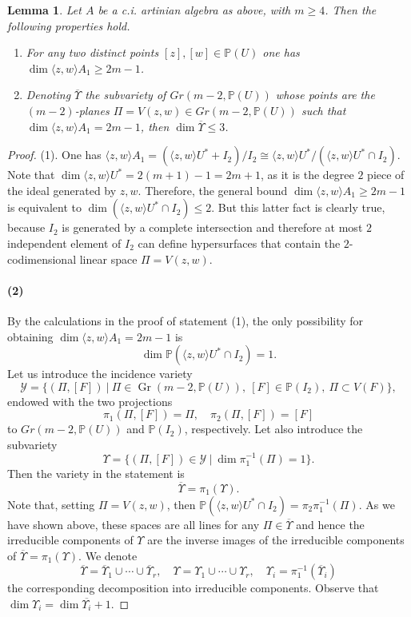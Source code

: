 \documentclass[10pt, a4paper]{amsart}
\theoremstyle{plain}
\newtheorem{lm}[prop]{Lemma}
\theoremstyle{definition}
\theoremstyle{remark}
\def\PP{\mathbb{P}}
\begin{document}
 \begin{lm}\label{lm:bdeltageq1} Let $A$ be a c.i. artinian algebra as above, with $m\geq 4$. Then the following properties hold.
\begin{enumerate}
\item For any two distinct points $[z],[w]\in \PP(U)$ one has $\dim \langle z,w\rangle A_1\geq 2m-1$.
\item Denoting $\overline{\varUpsilon}$ the subvariety of $Gr(m-2,\PP(U))$ whose points are the $(m-2)$-planes $\Pi=V(z,w)\in Gr(m-2,\PP(U))$ such that $\dim \langle z,w\rangle A_1= 2m-1$, then $\dim \overline{\varUpsilon}\leq 3$. 
\end{enumerate}
\end{lm}
\begin{proof} {(1).} One has 
$\langle z,w\rangle A_1=(\langle z,w\rangle U^\ast+I_2)/I_2\cong \langle z,w\rangle U^\ast/(\langle z,w\rangle U^\ast\cap I_2)$.
Note that $\dim\langle z,w\rangle U^\ast=2(m+1)-1=2m+1$, as it is the degree $2$ piece of the ideal generated by $z,w$. Therefore, the general bound  $\dim \langle z,w\rangle A_1\geq 2m-1$ is equivalent to $\dim(\langle z,w\rangle U^\ast\cap I_2)\leq 2$. But this latter fact is clearly true, because $I_2$ is generated by a complete intersection and therefore at most $2$  independent element of $I_2$ can define hypersurfaces that contain the $2$-codimensional linear space $\Pi=V(z,w)$. 
\paragraph{(2)}
By the calculations in the proof of statement (1), the only possibility for obtaining $\dim \langle z,w\rangle A_1= 2m-1$ is $$\dim\PP(\langle z,w\rangle U^\ast\cap I_2)=1.$$ Let us introduce the incidence variety
$$\mathcal{Y}=\{(\Pi,[F])\ |\  \Pi\in \operatorname{Gr}(m-2,\PP(U)),\ [F]\in \PP(I_2),\ \Pi \subset V(F)\},$$ endowed with the two projections 
$$\pi_1(\Pi,[F])=\Pi,\quad \pi_2(\Pi,[F])=[F]$$ to $Gr(m-2,\PP(U))$ and $\PP(I_2)$, respectively. Let also introduce the subvariety
$$\varUpsilon=\{(\Pi,[F])\in\mathcal{Y}\ |\ \dim\pi_1^{-1}(\Pi)=1\}.$$
Then the variety in the statement is $$\overline{\varUpsilon}=\pi_1(\varUpsilon).$$
Note that, setting $\Pi=V(z,w)$, then $\PP(\langle z,w\rangle U^\ast\cap I_2)=\pi_2\pi_1^{-1}(\Pi)$. As we have shown above, these spaces are all lines for any $\Pi\in\overline{\varUpsilon}$ and hence the irreducible components of $\varUpsilon$ are the inverse images of the irreducible components of $\overline{\varUpsilon}=\pi_1(\varUpsilon)$. We denote
$$\overline{\varUpsilon}=\overline{\varUpsilon}_1\cup\cdots\cup\overline{\varUpsilon}_r, \quad \varUpsilon=\varUpsilon_1\cup\cdots\cup\varUpsilon_r,\quad \varUpsilon_i=\pi_1^{-1}(\overline{\varUpsilon}_i)$$ the corresponding decomposition into irreducible components. Observe that $\dim\varUpsilon_i=\dim\overline{\varUpsilon_i}+1$.


\end{proof}
\end{document}
